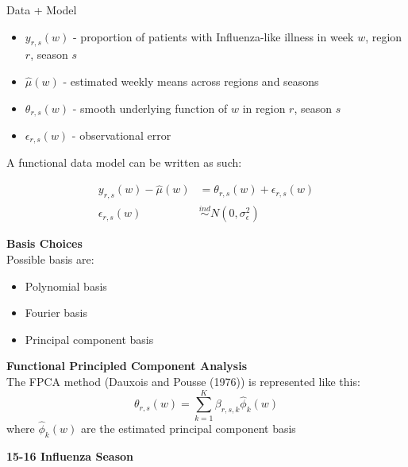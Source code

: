 \documentclass[final]{beamer}
\newlength{\onecolwid}
\begin{document}
\begin{frame}[t]
\begin{columns}[t]
\begin{column}{\onecolwid}
\begin{block}{Data + Model}

\begin{itemize}
\item $y_{r,s}(w)$ - proportion of patients with Influenza-like illness in week $w$, region $r$, season $s$
\item $\hat{\mu}(w)$ - estimated weekly means across regions and seasons
\item $\theta_{r,s}(w)$ - smooth underlying function of $w$ in region $r$, season $s$
\item $\epsilon_{r,s}(w)$ - observational error
\end{itemize}

A functional data model can be written as such:

\begin{align}
y_{r,s}(w) - \hat{\mu}(w) &= \theta_{r,s}(w) + \epsilon_{r,s}(w) \\
\epsilon_{r,s}(w) &\overset{ind}{\sim} N(0,\sigma^2_{\epsilon}) \nonumber
\end{align}


\textbf{Basis Choices} \\

Possible basis are: \\

\begin{itemize}
\item Polynomial basis
\item Fourier basis
\item Principal component basis \\
\end{itemize}

\vspace{10mm}

\textbf{Functional Principled Component Analysis} \\

The FPCA method (Dauxois and Pousse (1976)) is represented like this:
\begin{equation}
  \theta_{r,s} (w) = \sum_{k=1}^{K} \beta_{r,s,k} \hat{\phi}_k (w)
\end{equation}
where $\hat{\phi}_k (w)$ are the estimated principal component basis

\vspace{10mm}

\textbf{15-16 Influenza Season}


\end{block}
\end{column}
\end{columns}
\end{frame}
\end{document}
